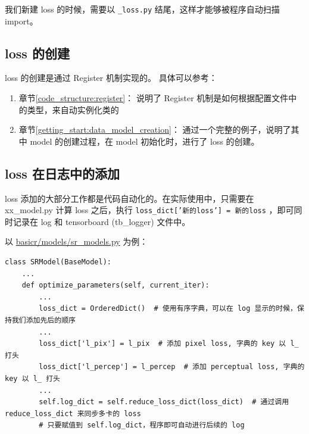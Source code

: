 \documentclass[../main.tex]{subfiles}
\begin{document}
\vspace{0.5cm}
\renewcommand*\DTstyle{\ttfamily\textcolor{black}}
\vspace{0.5cm}

\begin{hl} %
    我们新建 loss 的时候，需要以 \texttt{\_loss.py} 结尾，这样才能够被程序自动扫描 import。
\end{hl}

\subsection{loss 的创建}\label{code_structure:loss_creation}

loss 的创建是通过 Register 机制实现的。
具体可以参考：
\begin{enumerate}
    \item 章节\ref{code_structure:register}： 说明了 Register 机制是如何根据配置文件中的类型，来自动实例化类的
    \item 章节\ref{getting_start:data_model_creation}： 通过一个完整的例子，说明了其中 model 的创建过程，在 model 初始化时，进行了 loss 的创建。
\end{enumerate}

\subsection{loss 在日志中的添加}\label{code_structure:loss_log}

loss 添加的大部分工作都是代码自动化的。在实际使用中，只需要在 xx\_model.py 计算 loss 之后，执行 \texttt{loss\_dict['新的loss'] = 新的loss} ，即可同时记录在 log 和 tensorboard (tb\_logger) 文件中。

以 \href{https://github.com/XPixelGroup/BasicSR/blob/master/basicsr/models/sr_model.py}{basicr/models/sr\_models.py} 为例：
\begin{verbatim}
class SRModel(BaseModel):
    ...
    def optimize_parameters(self, current_iter):
        ...
        loss_dict = OrderedDict()  # 使用有序字典，可以在 log 显示的时候，保持我们添加先后的顺序
        ...
        loss_dict['l_pix'] = l_pix  # 添加 pixel loss, 字典的 key 以 l_ 打头
        loss_dict['l_percep'] = l_percep  # 添加 perceptual loss, 字典的 key 以 l_ 打头
        ...
        self.log_dict = self.reduce_loss_dict(loss_dict)  # 通过调用 reduce_loss_dict 来同步多卡的 loss
        # 只要赋值到 self.log_dict，程序即可自动进行后续的 log
\end{verbatim}
\end{document}
